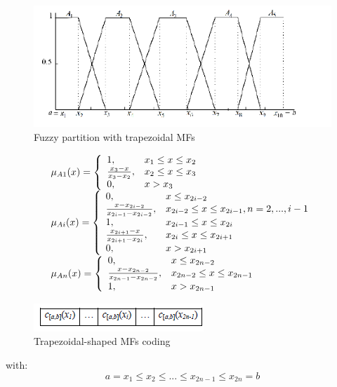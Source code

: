 \documentclass[runningheads,a4paper]{llncs}
\begin{document}
\begin{figure}[!ht]
	\begin{center}
		\includegraphics[scale=0.95]{fig/pr}
		\caption {Fuzzy partition  with trapezoidal MFs}
		\label{prtr} 
	\end{center}
\end{figure}
\begin{equation} 
\begin{tabular}{l}
$\mu_{A1}(x)=  \left \{
\begin{array}{ll}
1, &x_{1} \leq x \leq x_{2}\\
\frac{x_{3} - x}{x_{3} - x_{2}}, &x_{2} \leq x \leq x_{3}\\
0        , &x > x_{3}\\
\end{array} 
\right.$		\\ 	
$\mu_{Ai}(x)= \left \{
\begin{array}{ll} 
0, &x \leq x_{2i-2}\\
\frac{x - x_{2i-2}}{x_{2i-1} - x_{2i-2}}, &x_{2i-2} \leq x \leq x_{2i-1},n=2,...,i-1\\
1, & x_{2i-1} \leq x \leq x_{2i}\\
\frac{x_{2i+1} - x}{x_{2i+1} - x_{2i}},& x_{2i} \leq x \leq x_{2i+1}\\
0  , &x > x_{2i+1}\\
\end{array}  
\right.	$		\\
$\mu_{An}(x)= \left \{
\begin{array}{ll} 
0, &x \leq x_{2n-2}\\
\frac{x - x_{2n-2}}{x_{2n-1} - x_{2n-2}},& x_{2n-2} \leq x \leq x_{2n-1}\\
1 ,& x > x_{2n-1} 
\end{array} 
\right.$\\
\label{e1}
\end{tabular}
\end{equation}
\begin{figure}[!ht] 
	\begin{center}
		\includegraphics[scale=0.95]{fig/at}
		\caption {Trapezoidal-shaped MFs coding}
		\label{at}
	\end{center}
\end{figure}
with:
\begin{equation}
a = x_{1} \leq x_{2} \leq...\leq x_{2n-1} \leq x_{2n}=b 	
\end{equation}		
\end{document}
